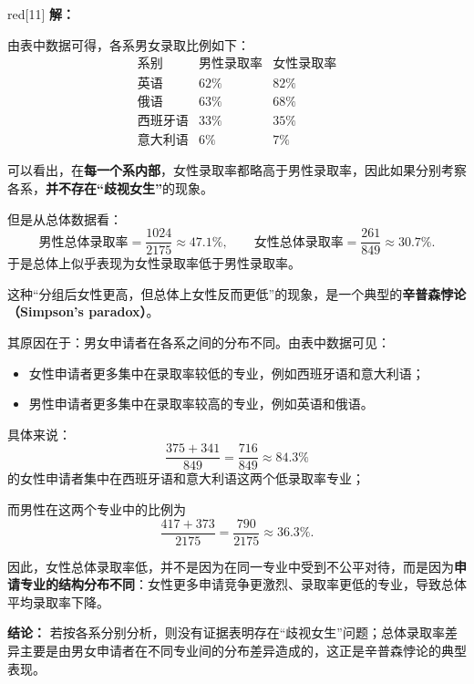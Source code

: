 \documentclass[12pt,onecolumn]{ctexrep}
\begin{document}
\begin{mybox}{red}{}[11]
    \textbf{解：}

    由表中数据可得，各系男女录取比例如下：
    \[
        \begin{array}{c|cc}
            \text{系别}   & \text{男性录取率} & \text{女性录取率} \\
            \hline
            \text{英语}   & 62\%         & 82\%         \\
            \text{俄语}   & 63\%         & 68\%         \\
            \text{西班牙语} & 33\%         & 35\%         \\
            \text{意大利语} & 6\%          & 7\%
        \end{array}
    \]

    可以看出，在\textbf{每一个系内部}，女性录取率都略高于男性录取率，因此如果分别考察各系，\textbf{并不存在“歧视女生”}的现象。

    但是从总体数据看：
    \[
        \text{男性总体录取率}=\frac{1024}{2175}\approx 47.1\%,
        \qquad
        \text{女性总体录取率}=\frac{261}{849}\approx 30.7\%.
    \]
    于是总体上似乎表现为女性录取率低于男性录取率。

    这种“分组后女性更高，但总体上女性反而更低”的现象，是一个典型的\textbf{辛普森悖论（Simpson's paradox）}。

    其原因在于：男女申请者在各系之间的分布不同。由表中数据可见：

    \begin{itemize}
        \item 女性申请者更多集中在录取率较低的专业，例如西班牙语和意大利语；
        \item 男性申请者更多集中在录取率较高的专业，例如英语和俄语。
    \end{itemize}

    具体来说：
    \[
        \frac{375+341}{849}=\frac{716}{849}\approx 84.3\%
    \]
    的女性申请者集中在西班牙语和意大利语这两个低录取率专业；

    而男性在这两个专业中的比例为
    \[
        \frac{417+373}{2175}=\frac{790}{2175}\approx 36.3\%.
    \]

    因此，女性总体录取率低，并不是因为在同一专业中受到不公平对待，而是因为\textbf{申请专业的结构分布不同}：女性更多申请竞争更激烈、录取率更低的专业，导致总体平均录取率下降。

    \textbf{结论：}
    若按各系分别分析，则没有证据表明存在“歧视女生”问题；总体录取率差异主要是由男女申请者在不同专业间的分布差异造成的，这正是辛普森悖论的典型表现。
\end{mybox}
\end{document}
